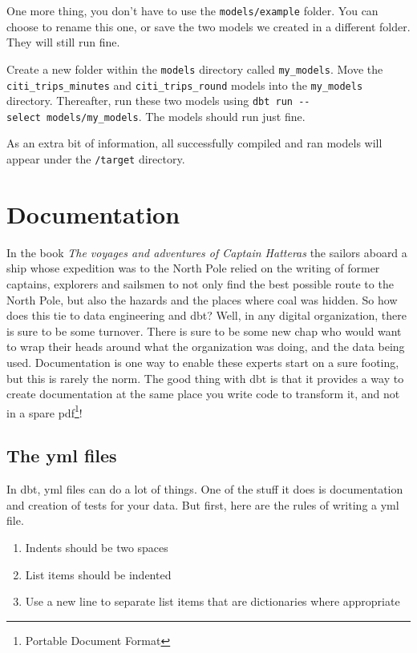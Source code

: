 \documentclass[
]{book}
\begin{document}
One more thing, you don't have to use the \texttt{models/example} folder. You can choose to rename this one, or save the two models we created in a different folder. They will still run fine.

Create a new folder within the \texttt{models} directory called \texttt{my\_models}. Move the \texttt{citi\_trips\_minutes} and \texttt{citi\_trips\_round} models into the \texttt{my\_models} directory. Thereafter, run these two models using \texttt{dbt\ run\ -\/-select\ models/my\_models}. The models should run just fine.

As an extra bit of information, all successfully compiled and ran models will appear under the \texttt{/target} directory.

\hypertarget{documentation-1}{%
\chapter{Documentation}\label{documentation-1}}

In the book \emph{The voyages and adventures of Captain Hatteras} the sailors aboard a ship whose expedition was to the North Pole relied on the writing of former captains, explorers and sailsmen to not only find the best possible route to the North Pole, but also the hazards and the places where coal was hidden. So how does this tie to data engineering and dbt? Well, in any digital organization, there is sure to be some turnover. There is sure to be some new chap who would want to wrap their heads around what the organization was doing, and the data being used. Documentation is one way to enable these experts start on a sure footing, but this is rarely the norm. The good thing with dbt is that it provides a way to create documentation at the same place you write code to transform it, and not in a spare pdf\footnote{Portable Document Format}!

\hypertarget{the-yml-files}{%
\section{The yml files}\label{the-yml-files}}

In dbt, yml files can do a lot of things. One of the stuff it does is documentation and creation of tests for your data. But first, here are the rules of writing a yml file.

\begin{enumerate}
\def\labelenumi{\arabic{enumi}.}
\item
  Indents should be two spaces
\item
  List items should be indented
\item
  Use a new line to separate list items that are dictionaries where appropriate
\end{enumerate}
\end{document}
